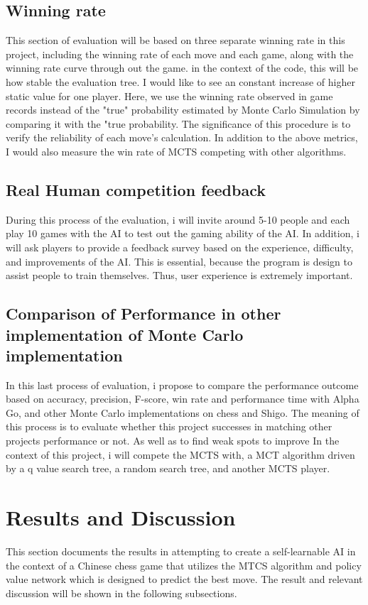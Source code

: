 \documentclass[10pt,twocolumn]{article}
\begin{document}
\subsection{Winning rate}
    This section of evaluation will be based on three separate winning rate in this project, including the winning rate of each move and each game, along with the winning rate curve through out the game. in the context of the code, this will be how stable the evaluation tree. I would like to see an constant increase of higher static value for one player. Here, we use the winning rate observed in game records instead of the "true" probability estimated by Monte Carlo Simulation by comparing it with the "true probability\cite{}. The significance of this procedure is to verify the reliability of each move's calculation. In addition to the above metrics, I would also measure the win rate of MCTS competing with other algorithms. 
    
\subsection{Real Human competition feedback}
    During this process of the evaluation, i will invite around 5-10 people and each play 10 games with the AI to test out the gaming ability of the AI. In addition, i will ask players to provide a feedback survey based on the experience, difficulty, and improvements of the AI. This is essential, because the program is design to assist people to train themselves. Thus, user experience is extremely important. 
    
\subsection{Comparison of Performance in other implementation of Monte Carlo implementation}
    In this last process of evaluation, i propose to compare the performance outcome based on accuracy, precision, F-score, win rate and performance time with Alpha Go, and other Monte Carlo implementations on chess and Shigo. The meaning of this process is to evaluate whether  this project successes in matching other projects performance or not. As well as to find weak spots to improve\cite{Accuracy}
    In the context of this project, i will compete the MCTS with, a MCT algorithm driven by a q value search tree, a random search tree, and another MCTS player. 
    

\section{Results and Discussion}
    This section documents the results in attempting to create a self-learnable AI in the context of a Chinese chess game that utilizes the MTCS algorithm and policy value network which is designed to predict the best move. The result and relevant discussion will be shown in the following subsections. 
\end{document}
